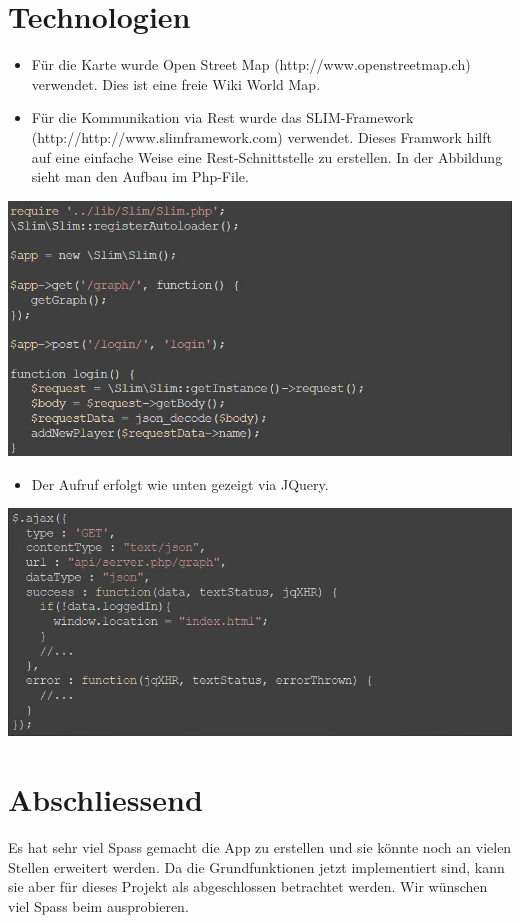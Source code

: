\documentclass[11pt]{article}
\begin{document}
\section{Technologien}
\begin{itemize}
\item Für die Karte wurde Open Street Map (http://www.openstreetmap.ch) verwendet. Dies ist eine freie Wiki World Map.
\item Für die Kommunikation via Rest wurde das SLIM-Framework (http://http://www.slimframework.com) verwendet. Dieses Framwork hilft auf eine einfache Weise eine Rest-Schnittstelle zu erstellen. In der Abbildung sieht man den Aufbau im Php-File.
\end{itemize}
\includegraphics[width=14cm]{Bilder/slim.jpg}

\begin{itemize}
\item Der Aufruf erfolgt wie unten gezeigt via JQuery.
\end{itemize}
\includegraphics[width=14cm]{Bilder/jquery.jpg}




\section{Abschliessend}
Es hat sehr viel Spass gemacht die App zu erstellen und sie könnte noch an vielen Stellen erweitert werden. Da die Grundfunktionen jetzt implementiert sind, kann sie aber für dieses Projekt als abgeschlossen betrachtet werden. 
Wir wünschen viel Spass beim ausprobieren.
\end{document}
